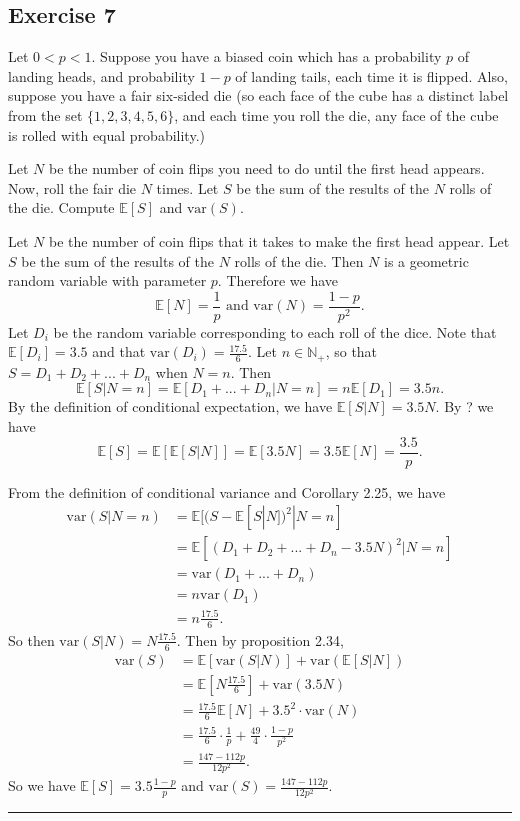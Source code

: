 \documentclass{article}
\theoremstyle{break}
\newenvironment{solution}{{\bf Solution:}}{\hfill\rule{2mm}{2mm}}
\newcommand{\E}{\mathbb{E}}
\newcommand{\var}{\mathrm{var}}
\newcommand{\N}{\mathbb{N}}
\begin{document}
\subsection*{Exercise 7}
Let $0 < p < 1$. Suppose you have a biased coin which has a probability $p$ of landing heads, and probability $1-p$ of landing tails, each time it is flipped. Also, suppose you have a fair six-sided die (so each face of the cube has a distinct label from the set $\{1, 2, 3, 4, 5, 6\}$, and each time you roll the die, any face of the cube is rolled with equal probability.)

Let $N$ be the number of coin flips you need to do until the first head appears. Now, roll the fair die $N$ times. Let $S$ be the sum of the results of the $N$ rolls of the die. Compute $\E[S]$ and $\var(S)$.


\begin{solution}

Let $N$ be the number of coin flips that it takes to make the first head appear. Let $S$ be the sum of the results of the $N$ rolls of the die. Then $N$ is a geometric random variable with parameter $p$. Therefore we have 
\[ \E[N] = \frac{1}{p} \text{ and } \var(N) = \frac{1-p}{p^2}.\]
Let $D_i$ be the random variable corresponding to each roll of the dice. Note that $\E[D_i] = 3.5$ and that $\var(D_i) = \frac{17.5}{6}$. Let $n \in \N_+$, so that $S = D_1 + D_2 + ... + D_n$ when $N = n$. Then 
\[ \E[S | N = n] = \E[D_1 + ... + D_n | N = n] = n \E[D_1] = 3.5n.\]
By the definition of conditional expectation, we have $\E[S | N] = 3.5N$. By ? we have 
\[ \E[S] = \E[ \E[ S | N]] = \E[3.5 N] = 3.5 \E[N] = \frac{3.5}{p}.\]

From the definition of conditional variance and Corollary 2.25, we have 
\begin{align*}
\var(S | N = n) &= \E[ (S- \E[S | N])^2 | N = n] \\
	&= \E[ (D_1 + D_2 + ... + D_n - 3.5N)^2 | N = n] \\
	&= \var(D_1 + ... + D_n) \\
	&= n \var(D_1) \\
	&= n \frac{17.5}{6}.
\end{align*}
So then $\var(S | N) = N \frac{17.5}{6}$.
Then by proposition 2.34,
\begin{align*}
\var(S) &= \E[ \var(S | N) ] +  \var( \E[ S  | N ] ) \\
	&= \E[ N \frac{17.5}{6} ]  + \var( 3.5 N ) \\
	&= \frac{17.5}{6} \E[N] + 3.5^2 \cdot \var(N) \\
	&= \frac{17.5}{6} \cdot \frac{1}{p} + \frac{49}{4} \cdot \frac{1-p}{p^2} \\
	&= \frac{147 -112p}{12p^2} .
\end{align*}
So we have $\E[S] = 3.5 \frac{1-p}{p}$ and $\var(S) =  \frac{147 -112p}{12p^2} $.
\end{solution}
\end{document}

